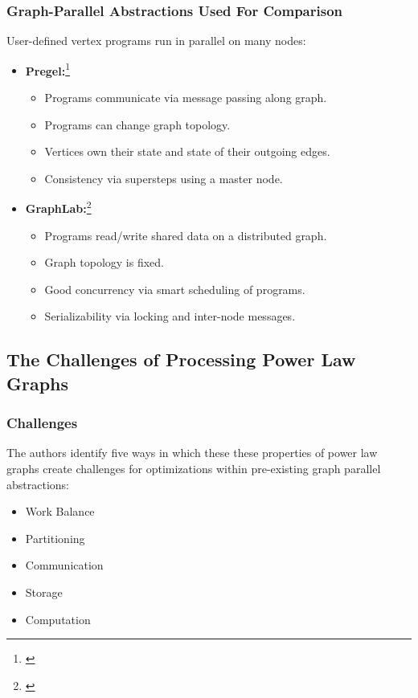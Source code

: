 \begin{frame}
  \frametitle{Graph-Parallel Abstractions Used For Comparison}
  User-defined vertex programs run in parallel on many nodes:
  \begin{itemize}
    \item \textbf{Pregel:}\footnote{\cite[SIGMOD '10]{malewicz2010pregel}}
      \begin{itemize}
        \item Programs communicate via message passing along graph.
        \item Programs can change graph topology.
        \item Vertices own their state and state of their outgoing edges.
        \item Consistency via supersteps using a master node.
      \end{itemize}
    \item \textbf{GraphLab:}\footnote{\cite[VLDB '12]{low2012distributed}}
      \begin{itemize}
        \item Programs read/write shared data on a distributed graph.
        \item Graph topology is fixed.
        \item Good concurrency via smart scheduling of programs.
        \item Serializability via locking and inter-node messages.
      \end{itemize}
  \end{itemize}
\end{frame}


\subsection{The Challenges of Processing Power Law Graphs}

\begin{frame}
  \frametitle{Challenges}
  The authors identify five ways in which these these properties of power law
  graphs create challenges for optimizations within pre-existing graph parallel
  abstractions:
  \begin{itemize}
    \item Work Balance
    \item Partitioning
    \item Communication
    \item Storage
    \item Computation
  \end{itemize}
\end{frame}
